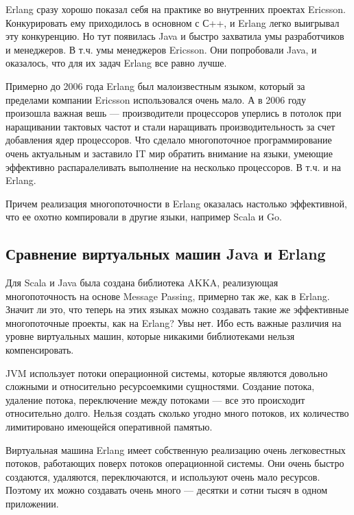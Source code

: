 \documentclass[10pt, a5paper]{article}
\begin{document}
Erlang сразу хорошо показал себя на практике во внутренних проектах Ericsson. Конкурировать ему приходилось в основном с С++, и Erlang легко выигрывал эту конкуренцию. Но тут появилась Java и быстро захватила умы разработчиков и менеджеров. В т.ч. умы менеджеров Ericsson. Они попробовали Java, и оказалось, что для их задач Erlang все равно лучше.

Примерно до 2006 года Erlang был малоизвестным языком, который за пределами компании Ericsson использовался очень мало. А в 2006 году произошла важная вешь --- производители процессоров уперлись в потолок при наращивании тактовых частот и стали наращивать производительность за счет добавления ядер процессоров. Что сделало многопоточное программирование очень актуальным и заставило IT мир обратить внимание на языки, умеющие эффективно распаралеливать выполнение на несколько процессоров. В т.ч. и на Erlang.

Причем реализация многопоточности в Erlang оказалась \linebreak настолько эффективной, что ее охотно компировали в другие языки, например Scala и Go.

\subsection*{Сравнение виртуальных машин Java и Erlang}

Для Scala и Java была создана библиотека AKKA, реализующая многопоточность на основе Message Passing, примерно так же, как в Erlang. Значит ли это, что теперь на этих языках можно создавать такие же эффективные многопоточные проекты, как на Erlang? Увы нет. Ибо есть важные различия на уровне виртуальных машин, которые никакими библиотеками нельзя компенсировать.

JVM использует потоки операционной системы, которые являются довольно сложными и относительно ресурсоемкими сущностями. Создание потока, удаление потока, переключение между потоками --- все это происходит относительно долго. Нельзя создать сколько угодно много потоков, их количество лимитировано имеющейся оперативной памятью.

Виртуальная машина Erlang имеет собственную реализацию \linebreak очень легковестных потоков, работающих поверх потоков операционной системы. Они очень быстро создаются, удаляются, переключаются, и используют очень мало ресурсов. Поэтому их можно создавать очень много --- десятки и сотни тысяч в одном приложении.
\end{document}
